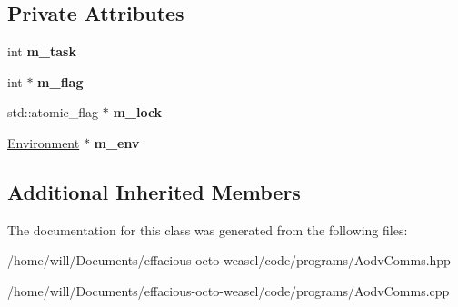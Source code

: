 \subsection*{Private Attributes}
\begin{DoxyCompactItemize}
\item 
int {\bfseries m\+\_\+task}\hypertarget{class_aodv_comms_a195ea6c48ce634758256d8eda97a7548}{}\label{class_aodv_comms_a195ea6c48ce634758256d8eda97a7548}

\item 
int $\ast$ {\bfseries m\+\_\+flag}\hypertarget{class_aodv_comms_a37a4a277c4e2c3ed042b673775e9c461}{}\label{class_aodv_comms_a37a4a277c4e2c3ed042b673775e9c461}

\item 
std\+::atomic\+\_\+flag $\ast$ {\bfseries m\+\_\+lock}\hypertarget{class_aodv_comms_a9e7e11f3158e75ef356f824e4c71ad17}{}\label{class_aodv_comms_a9e7e11f3158e75ef356f824e4c71ad17}

\item 
\hyperlink{class_environment}{Environment} $\ast$ {\bfseries m\+\_\+env}\hypertarget{class_aodv_comms_a0cbfb70d74c0ba1faf5cc5ec434e6fec}{}\label{class_aodv_comms_a0cbfb70d74c0ba1faf5cc5ec434e6fec}

\end{DoxyCompactItemize}
\subsection*{Additional Inherited Members}


The documentation for this class was generated from the following files\+:\begin{DoxyCompactItemize}
\item 
/home/will/\+Documents/effacious-\/octo-\/weasel/code/programs/Aodv\+Comms.\+hpp\item 
/home/will/\+Documents/effacious-\/octo-\/weasel/code/programs/Aodv\+Comms.\+cpp\end{DoxyCompactItemize}
